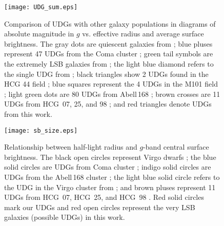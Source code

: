 \documentclass[twocolumn,trackchanges]{aastex61}
\begin{document}
\begin{figure}
 \setlength{\abovecaptionskip}{-15pt}
\begin{center}
\texttt{[image: UDG\_sum.eps]}
\caption{Comparison of UDGs with other galaxy populations in diagrams of absolute magnitude in $g$ vs. effective radius and average surface brightness. The gray dots are quiescent galaxies from \cite{Brodie2011}; blue pluses represent 47 UDGs from the Coma cluster \citep{van Dokkum2015a}; green tail symbols are the extremely LSB galaxies from \cite{Mihos2015}; the light blue diamond refers to the single UDG from \cite{Beasley2016}; black triangles show 2 UDGs found in the HCG 44 field \citep{Smith2016}; blue squares represent the 4 UDGs in the M101 field \citep{Merritt2016};  light green dots are 80 UDGs from Abell\,168 \citep{Roman2017}; brown crosses are 11 UDGs from HCG~07, 25, and 98 \citep{RomanTrujillo2016}; and red triangles denote UDGs from this work.}
\label{fig:fig6}
\end{center}
\end{figure}


\begin{figure}
\begin{center}
\texttt{[image: sb\_size.eps]}
\caption{Relationship between half-light radius and $g$-band central surface brightness. The black open circles represent Virgo dwarfs \citep{Gavazzi2005}; the blue solid circles are UDGs from Coma cluster \citep{van Dokkum2015a}; indigo solid circles are UDGs from the Abell\,168 cluster \citep{Roman2017}; the light blue solid circle refers to the UDG in the Virgo cluster from \cite{Beasley2016}; and brown pluses represent 11 UDGs from HCG~07, HCG~25, and HCG~98 \citep{RomanTrujillo2016}. Red solid circles mark our UDGs and  red open circles represent the very LSB galaxies (possible UDGs) in this work.}
\label{fig:fig7}
\end{center}
\end{figure}
\end{document}
